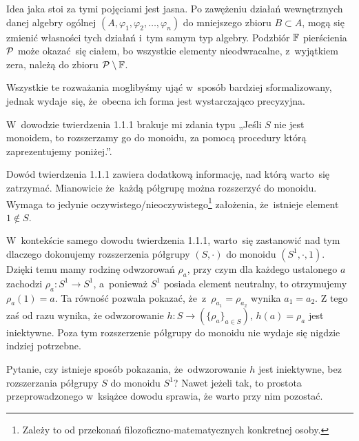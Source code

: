 \documentclass[a4paper,11pt]{article}
\begin{document}
Idea jaka stoi za tymi pojęciami jest jasna. Po zawężeniu działań
wewnętrznych danej algebry ogólnej
$( A, \varphi_{ 1 }, \varphi_{ 2 }, \ldots, \varphi_{ n } )$ do
mniejszego zbioru $B \subset A$, mogą się zmienić własności tych
działań i~tym samym typ algebry. Podzbiór $\mathbb{F}$ pierścienia $\mathcal{P}$
może okazać~się ciałem, bo wszystkie elementy nieodwracalne,
z~wyjątkiem zera, należą do zbioru $\mathcal{P} \setminus \mathbb{F}$.

Wszystkie te rozważania moglibyśmy ująć w~sposób bardziej
sformalizowany, jednak wydaje~się, że~obecna ich forma jest
wystarczająco precyzyjna.

\vspace{\spaceFour}





 W~dowodzie twierdzenia 1.1.1 brakuje mi zdania typu
„Jeśli $S$ nie jest monoidem, to rozszerzamy go do monoidu, za pomocą
procedury którą zaprezentujemy poniżej.”.

\vspace{\spaceFour}





 Dowód twierdzenia 1.1.1 zawiera dodatkową informację,
nad którą warto~się zatrzymać. Mianowicie że~każdą półgrupę można
rozszerzyć do monoidu. Wymaga to jedynie
oczywistego/nieoczywistego\footnote{Zależy to od przekonań
  filozoficzno-matematycznych konkretnej osoby.} założenia,
że~istnieje element $1 \notin S$.

W~kontekście samego dowodu twierdzenia 1.1.1, warto~się zastanowić nad
tym dlaczego dokonujemy rozszerzenia półgrupy $( S, \cdot )$ do
monoidu $( S^{ 1 }, \cdot, 1 )$. Dzięki temu mamy rodzinę odwzorowań
$\rho_{ a }$, przy czym dla każdego ustalonego $a$ zachodzi
$\rho_{ a } : S^{ 1 } \to S^{ 1 }$, a~ponieważ $S^{ 1 }$ posiada
element neutralny, to otrzymujemy $\rho_{ a }( 1 ) = a$. Ta równość
pozwala pokazać, że~z~$\rho_{ a_{ 1 } } = \rho_{ a_{ 2 } }$ wynika
$a_{ 1 } = a_{ 2 }$. Z tego zaś od razu wynika, że odwzorowanie
$h : S \to ( \{ \rho_{ a } \}_{ a \in S } )$, $h( a ) = \rho_{ a }$
jest iniektywne. Poza tym rozszerzenie półgrupy do monoidu nie wydaje
się nigdzie indziej potrzebne.

Pytanie, czy istnieje sposób pokazania, że~odwzorowanie $h$ jest
iniektywne, bez rozszerzania półgrupy $S$ do monoidu $S^{ 1 }$? Nawet
jeżeli tak, to prostota przeprowadzonego w~książce dowodu sprawia, że
warto przy nim pozostać.
\end{document}
